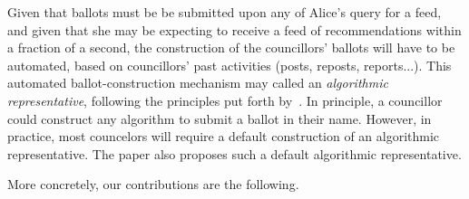 
Given that ballots must be be submitted upon any of Alice's query for a feed,
and given that she may be expecting to receive a feed of recommendations within a fraction of a second,
the construction of the councillors' ballots will have to be automated, 
based on councillors' past activities (posts, reposts, reports...).
This automated ballot-construction mechanism may called an \emph{algorithmic representative},
following the principles put forth 
by~\cite{DBLP:journals/pacmhci/LeeKKKYCSNLPP19,DBLP:conf/aaai/NoothigattuGADR18,DBLP:journals/ai/FreedmanBSDC20}.
In principle, a councillor could construct any algorithm to submit a ballot in their name.
However, in practice, most councelors will require a default construction of an algorithmic representative.
The paper also proposes such a default algorithmic representative.

More concretely, our contributions are the following.

